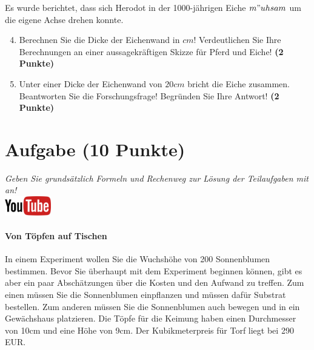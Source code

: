 \documentclass[a4paper, 9pt]{scrartcl}\usepackage[]{graphicx}\usepackage[]{xcolor}
\begin{document}
Es wurde berichtet, dass sich Herodot in der 1000-j{\"a}hrigen Eiche
$m{"u}hsam$ um die eigene Achse drehen konnte.

\begin{enumerate}
  \setcounter{enumi}{3}
\item Berechnen Sie die Dicke der Eichenwand in $cm$! Verdeutlichen Sie Ihre
  Berechnungen an einer aussagekr{\"a}ftigen Skizze f{\"u}r Pferd und Eiche! \textbf{(2 Punkte)} 
\item Unter einer Dicke der Eichenwand von $20cm$ bricht
  die Eiche zusammen. Beantworten Sie die Forschungsfrage! Begr{\"u}nden Sie
  Ihre Antwort! \textbf{(2 Punkte)} 
\end{enumerate}
 
\clearpage

\section{Aufgabe \hfill (10 Punkte)}

\textit{Geben Sie grunds{\"a}tzlich Formeln und Rechenweg zur L{\"o}sung der
  Teilaufgaben mit an!} \\[1Ex]

\hfill\href{https://youtu.be/57B-yYoFSk0}{\includegraphics[width =
  2cm]{img/youtube}} %
\hspace{2Ex}

\paragraph{Von T{\"o}pfen auf Tischen}



In einem Experiment wollen Sie die Wuchsh{\"o}he von 200
Sonnenblumen bestimmen. Bevor Sie {\"u}berhaupt mit dem Experiment beginnen
k{\"o}nnen, gibt es aber ein paar Absch{\"a}tzungen {\"u}ber die Kosten und den Aufwand
zu treffen. Zum einen m{\"u}ssen Sie die Sonnenblumen einpflanzen und m{\"u}ssen
daf{\"u}r Substrat bestellen. Zum anderen m{\"u}ssen Sie die Sonnenblumen auch
bewegen und in ein Gew{\"a}chshaus platzieren. Die T{\"o}pfe f{\"u}r die Keimung haben
einen Durchmesser von 10cm und eine H{\"o}he von 9cm. Der
Kubikmeterpreis f{\"u}r Torf liegt bei 290 EUR.
\end{document}
